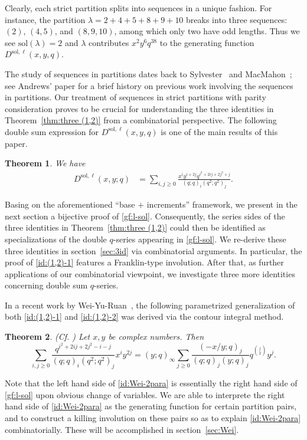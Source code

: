 \documentclass[11pt,reqno]{amsart}
\numberwithin{equation}{section}
\theoremstyle{plain}
\newtheorem{theorem}{Theorem}[section]
\theoremstyle{definition}
\def\sol{\mathrm{sol}}
\def\la{\lambda}
\begin{document}
Clearly, each strict partition splits into sequences in a unique fashion. For instance, the partition $\la=2+4+5+8+9+10$ breaks into three sequences: $(2)$, $(4,5)$, and $(8,9,10)$, among which only two have odd lengths. Thus we see $\sol(\la)=2$ and $\la$ contributes $x^2y^6q^{38}$ to the generating function $D^{\sol,\ell}(x,y,q)$. 

The study of sequences in partitions dates back to Sylvester~\cite[Th.~2.12]{syl82} and MacMahon~\cite[Vol.~II, Sect.~VII, Ch.~IV]{mac15}; see Andrews' paper \cite[Sect.~2]{and20} for a brief history on previous work involving the sequences in partitions. Our treatment of sequences in strict partitions with parity consideration proves to be crucial for understanding the three identities in Theorem~\ref{thm:three (1,2)} from a combinatorial perspective. The following double sum expression for $D^{\sol,\ell}(x,y,q)$ is one of the main results of this paper.

\begin{theorem}\label{thm:main}
We have 
\begin{align}\label{gf:l-sol}
D^{\sol,\ell}(x,y;q) &= \sum_{i,j\ge 0}\frac{x^iy^{i+2j}q^{i^2+2ij+2j^2+j}}{(q;q)_i(q^2;q^2)_j}.
\end{align}
\end{theorem}
Basing on the aforementioned ``base $+$ increments'' framework, we present in the next section a bijective proof of \eqref{gf:l-sol}. Consequently, the series sides of the three identities in Theorem~\ref{thm:three (1,2)} could then be identified as specializations of the double $q$-series appearing in \eqref{gf:l-sol}. We re-derive these three identities in section~\ref{sec:3id} via combinatorial arguments. In particular, the proof of \eqref{id:(1,2)-1} features a Franklin-type involution. After that, as further applications of our combinatorial viewpoint, we investigate three more identities concerning double sum $q$-series.

In a recent work by Wei-Yu-Ruan~\cite{WYR23}, the following parametrized generalization of both \eqref{id:(1,2)-1} and \eqref{id:(1,2)-2} was derived via the contour integral method.

\begin{theorem}\label{thm:Wei-2para}
(Cf. \cite[Theorem 1.1]{WYR23}) Let $x, y$ be complex numbers. Then
\begin{equation}
\sum\limits_{i, j\geq 0}\frac{q^{i^2+2ij+2j^2-i-j}}{(q; q)_{i}(q^2; q^2)_{j}}x^{i}y^{2j}=(y; q)_{\infty}\sum\limits_{j\geq 0}\frac{(-x/y; q)_{j}}{(q; q)_{j}(y; q)_{j}}q^{\binom{j}{2}}y^{j}.\label{id:Wei-2para}
\end{equation} 
\end{theorem}
Note that the left hand side of \eqref{id:Wei-2para} is essentially the right hand side of \eqref{gf:l-sol} upon obvious change of variables. We are able to interprete the right hand side of \eqref{id:Wei-2para} as the generating function for certain partition pairs, and to construct a killing involution on these pairs so as to explain \eqref{id:Wei-2para} combinatorially. These will be accomplished in section~\ref{sec:Wei}.
\end{document}
